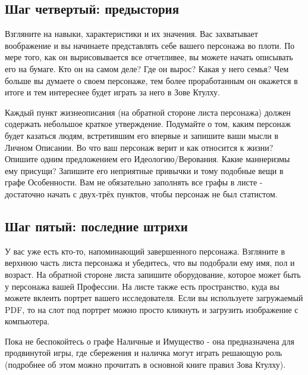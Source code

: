 \documentclass[letterpaper,twocolumn,openany, twoside, 11pt, usenames]{cocbook}
\begin{document}
\subsection*{Шаг четвертый: предыстория}

Взгляните на навыки, характеристики и их значения. Вас захватывает воображение и вы начинаете представлять себе вашего персонажа во плоти. По мере того, как он вырисовывается все отчетливее, вы можете начать описывать его на бумаге. Кто он на самом деле? Где он вырос? Какая у него семья? Чем больше вы думаете о своем персонаже, тем более проработанным он окажется в итоге и тем интереснее будет играть за него в Зове Ктулху.

Каждый пункт жизнеописания (на обратной стороне листа персонажа) должен содержать небольшое краткое утверждение. Подумайте о том, каким персонаж будет казаться людям, встретившим его впервые и запишите ваши мысли в Личном Описании. Во что ваш персонаж верит и как относится к жизни? Опишите одним предложением его Идеологию/Верования. Какие маннеризмы ему присущи? Запишите его неприятные привычки и тому подобные вещи в графе Особенности. Вам не обязательно заполнять все графы в листе - достаточно начать с двух-трёх пунктов, чтобы персонаж не был статистом.
\smallbreak
\noindent {}

\subsection*{Шаг пятый: последние штрихи}

У вас уже есть кто-то, напоминающий завершенного персонажа. Взгляните в верхнюю часть листа персонажа и убедитесь, что вы подобрали ему имя, пол и возраст. На обратной стороне листа запишите оборудование, которое может быть у персонажа вашей Профессии.
\smallbreak
\noindent {}
\smallbreak
На листе также есть пространство, куда вы можете вклеить портрет вашего исследователя. Если вы используете загружаемый PDF, то на слот под портрет можно просто кликнуть и загрузить изображение с компьютера.

Пока не беспокойтесь о графе Наличные и Имущество - она предназначена для продвинутой игры, где сбережения и наличка могут играть решающую роль (подробнее об этом можно прочитать в основной книге правил Зова Ктулху).
\end{document}
